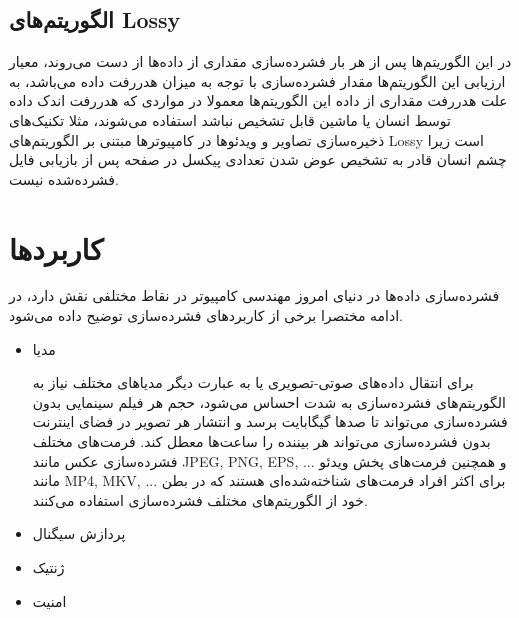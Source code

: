 \subsection{الگوریتم‌های Lossy}

در این الگوریتم‌ها پس از هر بار فشرده‌سازی مقداری از داده‌ها از دست می‌روند، معیار ارزیابی این الگوریتم‌ها 
مقدار فشرده‌سازی با توجه به میزان هدررفت داده می‌باشد، به علت هدررفت مقداری از داده این الگوریتم‌ها معمولا در 
مواردی که هدررفت اندک داده توسط انسان یا ماشین قابل تشخیص نباشد استفاده می‌شوند،‌ مثلا تکنیک‌های 
ذخیره‌سازی تصاویر و ویدئو‌ها در کامپیوترها مبتنی بر الگوریتم‌های Lossy 
است زیرا چشم انسان قادر به تشخیص عوض شدن تعدادی پیکسل در صفحه پس از بازیابی فایل فشرده‌شده نیست. 



\section{کاربردها}
فشرده‌سازی داده‌ها در دنیای امروز مهندسی کامپیوتر در نقاط مختلفی نقش دارد، در ادامه مختصرا برخی از کاربردهای 
فشرده‌سازی توضیح داده می‌شود.

\begin{itemize}
	\item مدیا
	
	برای انتقال داده‌های صوتی-تصویری یا به عبارت دیگر مدیاهای مختلف نیاز به الگوریتم‌های فشرده‌سازی به شدت احساس
	می‌شود، حجم هر فیلم سینمایی بدون فشرده‌سازی می‌تواند تا صدها گیگابایت برسد و انتشار هر تصویر در فضای اینترنت
	بدون فشرده‌سازی می‌تواند هر بیننده را ساعت‌ها معطل کند. فرمت‌های مختلف فشرده‌سازی عکس مانند
	JPEG, PNG, EPS, ...
	 و همچنین فرمت‌های پخش ویدئو‌ مانند 
	 MP4, MKV, ...
	 برای اکثر افراد فرمت‌های شناخته‌شده‌ای هستند که در بطن خود از الگوریتم‌های مختلف فشرده‌سازی استفاده می‌کنند.
	\item پردازش سیگنال\\
	
	\item ژنتیک\\
	
	\item امنیت\\
\end{itemize}